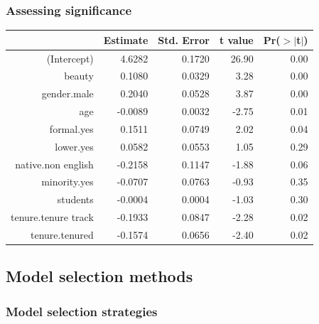\begin{frame}
\frametitle{Assessing significance}


{\scriptsize
\begin{center}
\begin{tabular}{rrrrr}
  \hline
 & Estimate & Std. Error & t value & Pr($>$$|$t$|$) \\ 
  \hline
(Intercept) & 4.6282 & 0.1720 & 26.90 & 0.00 \\ 
  beauty & 0.1080 & 0.0329 & 3.28 & 0.00 \\ 
  gender.male & 0.2040 & 0.0528 & 3.87 & 0.00 \\ 
  age & -0.0089 & 0.0032 & -2.75 & 0.01 \\ 
  formal.yes & 0.1511 & 0.0749 & 2.02 & 0.04 \\ 
  \rowcolor{oiB!50}
  lower.yes & 0.0582 & 0.0553 & 1.05 & 0.29 \\ 
    \rowcolor{oiB!50}
  native.non english & -0.2158 & 0.1147 & -1.88 & 0.06 \\ 
    \rowcolor{oiB!50}
  minority.yes & -0.0707 & 0.0763 & -0.93 & 0.35 \\ 
    \rowcolor{oiB!50}
  students & -0.0004 & 0.0004 & -1.03 & 0.30 \\ 
  tenure.tenure track & -0.1933 & 0.0847 & -2.28 & 0.02 \\ 
  tenure.tenured & -0.1574 & 0.0656 & -2.40 & 0.02 \\ 
   \hline
\end{tabular}
\end{center}
}

\end{frame}


\subsection{Model selection methods}


\begin{frame}
\frametitle{Model selection strategies}


\end{frame}


